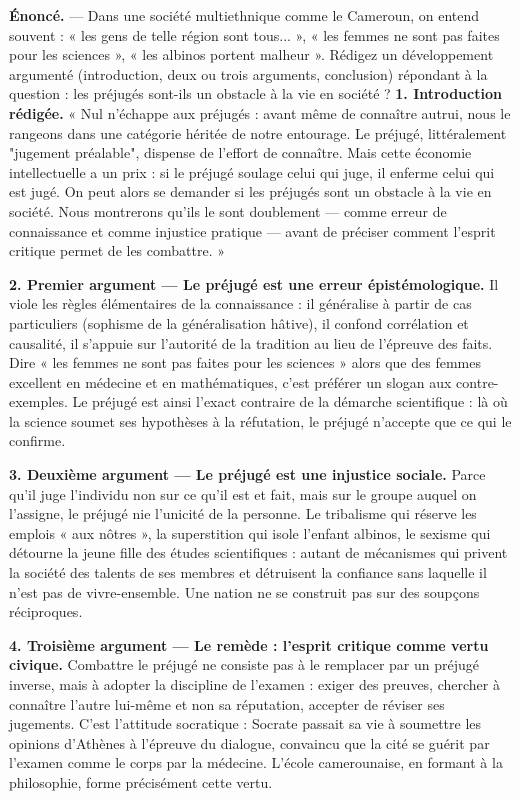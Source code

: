 \documentclass[11pt]{article}
\begin{document}
\begin{exoresolu}
\textbf{Énoncé.} — Dans une société multiethnique comme le Cameroun, on entend souvent : « les gens de telle région sont tous... », « les femmes ne sont pas faites pour les sciences », « les albinos portent malheur ». Rédigez un développement argumenté (introduction, deux ou trois arguments, conclusion) répondant à la question : les préjugés sont-ils un obstacle à la vie en société ?
\tcblower
\textbf{1. Introduction rédigée.} « Nul n'échappe aux préjugés : avant même de connaître autrui, nous le rangeons dans une catégorie héritée de notre entourage. Le préjugé, littéralement "jugement préalable", dispense de l'effort de connaître. Mais cette économie intellectuelle a un prix : si le préjugé soulage celui qui juge, il enferme celui qui est jugé. On peut alors se demander si les préjugés sont un obstacle à la vie en société. Nous montrerons qu'ils le sont doublement — comme erreur de connaissance et comme injustice pratique — avant de préciser comment l'esprit critique permet de les combattre. »

\textbf{2. Premier argument — Le préjugé est une erreur épistémologique.} Il viole les règles élémentaires de la connaissance : il généralise à partir de cas particuliers (sophisme de la généralisation hâtive), il confond corrélation et causalité, il s'appuie sur l'autorité de la tradition au lieu de l'épreuve des faits. Dire « les femmes ne sont pas faites pour les sciences » alors que des femmes excellent en médecine et en mathématiques, c'est préférer un slogan aux contre-exemples. Le préjugé est ainsi l'exact contraire de la démarche scientifique : là où la science soumet ses hypothèses à la réfutation, le préjugé n'accepte que ce qui le confirme.

\textbf{3. Deuxième argument — Le préjugé est une injustice sociale.} Parce qu'il juge l'individu non sur ce qu'il est et fait, mais sur le groupe auquel on l'assigne, le préjugé nie l'unicité de la personne. Le tribalisme qui réserve les emplois « aux nôtres », la superstition qui isole l'enfant albinos, le sexisme qui détourne la jeune fille des études scientifiques : autant de mécanismes qui privent la société des talents de ses membres et détruisent la confiance sans laquelle il n'est pas de vivre-ensemble. Une nation ne se construit pas sur des soupçons réciproques.

\textbf{4. Troisième argument — Le remède : l'esprit critique comme vertu civique.} Combattre le préjugé ne consiste pas à le remplacer par un préjugé inverse, mais à adopter la discipline de l'examen : exiger des preuves, chercher à connaître l'autre lui-même et non sa réputation, accepter de réviser ses jugements. C'est l'attitude socratique : Socrate passait sa vie à soumettre les opinions d'Athènes à l'épreuve du dialogue, convaincu que la cité se guérit par l'examen comme le corps par la médecine. L'école camerounaise, en formant à la philosophie, forme précisément cette vertu.


\end{exoresolu}
\end{document}
